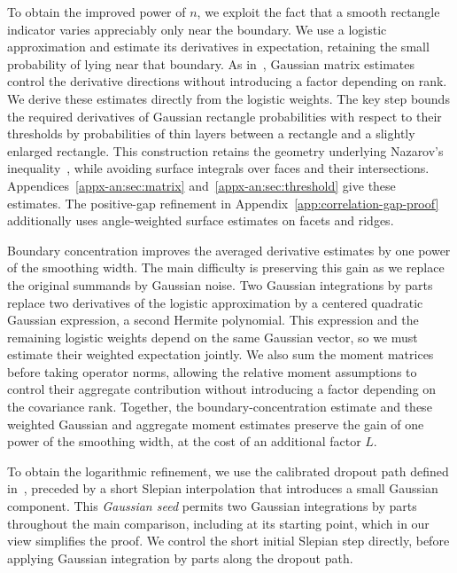 \documentclass[11pt,letterpaper]{article}
\theoremstyle{remark}
\begin{document}
To obtain the improved power of \(n\), we exploit the fact that a
smooth rectangle indicator varies appreciably only near the boundary.
We use a logistic approximation and estimate its derivatives in
expectation, retaining the small probability of lying near that
boundary. As in~\cite{GaoZhang}, Gaussian matrix estimates control
the derivative directions without introducing a factor depending on
rank. We derive these estimates directly from the logistic weights.
The key step bounds the required derivatives of Gaussian rectangle
probabilities with respect to their thresholds by probabilities of
thin layers between a rectangle and a slightly enlarged rectangle.
This construction retains the geometry underlying Nazarov's
inequality~\cite{Nazarov2003,CCK17N}, while avoiding surface integrals
over faces and their intersections. Appendices~\ref{appx-an:sec:matrix}
and~\ref{appx-an:sec:threshold} give these estimates.
The positive-gap refinement in Appendix~\ref{app:correlation-gap-proof}
additionally uses angle-weighted surface estimates on facets and ridges.

Boundary concentration improves the averaged derivative estimates
by one power of the smoothing width. The main difficulty is
preserving this gain as we replace the original summands by Gaussian
noise. Two Gaussian integrations by parts replace two derivatives
of the logistic approximation by a centered quadratic Gaussian
expression, a second Hermite polynomial. This expression and the
remaining logistic weights depend on the same Gaussian vector, so
we must estimate their weighted expectation jointly. We also sum
the moment matrices before taking operator norms, allowing the
relative moment assumptions to control their aggregate contribution
without introducing a factor depending on the covariance rank.
Together, the boundary-concentration estimate and these weighted
Gaussian and aggregate moment estimates preserve the gain of one
power of the smoothing width, at the cost of an additional factor
\(L\).

To obtain the logarithmic refinement, we use the calibrated dropout
path defined in~\cite[Section~4]{AL}, preceded by a short Slepian
interpolation that introduces a small Gaussian component. This
\emph{Gaussian seed} permits two Gaussian integrations by parts
throughout the main comparison, including at its starting point,
which in our view simplifies the proof. We control the short initial
Slepian step directly, before applying Gaussian integration by parts
along the dropout path.
\end{document}
